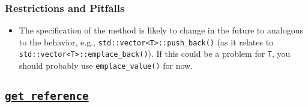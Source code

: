 \begin{subs}
\subsubsection{Restrictions and Pitfalls}
\begin{itemize}
  \item The specification of the method is likely to change in the future to
  analogous to the behavior, e.g., \texttt{std::vector<T>::push\_back()} (as it
  relates to \texttt{std::vector<T>::emplace\_back()}).  If this could be a
  problem for \texttt{T}, you should probably use \texttt{emplace\_value()} for now.
\end{itemize}

\end{subs}

\clearpage
\subsection{\underline{\texttt{get\_reference}}}

